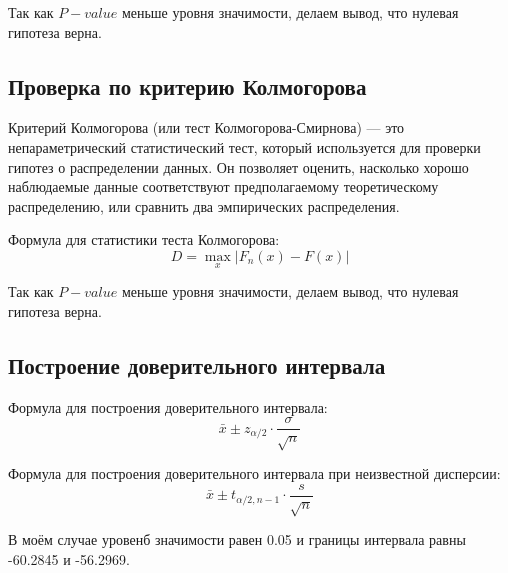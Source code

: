 Так как $P-value$ меньше уровня значимости, делаем вывод, что нулевая гипотеза верна.

\subsection*{Проверка по критерию Колмогорова}

Критерий Колмогорова (или тест Колмогорова-Смирнова) — это непараметрический статистический тест, который используется для проверки гипотез о распределении данных. Он позволяет оценить, насколько хорошо наблюдаемые данные соответствуют предполагаемому теоретическому распределению, или сравнить два эмпирических распределения.

Формула для статистики теста Колмогорова:
\[ D = \max_{x} |F_n(x) - F(x)| \]

\begin{spacing}{1.0}
    
\end{spacing}

Так как $P-value$ меньше уровня значимости, делаем вывод, что нулевая гипотеза верна.

\subsection*{Построение доверительного интервала}

Формула для построения доверительного интервала:
\[ \bar{x} \pm z_{\alpha/2} \cdot \frac{\sigma}{\sqrt{n}} \]

Формула для построения доверительного интервала при неизвестной дисперсии:
\[ \bar{x} \pm t_{\alpha/2, n-1} \cdot \frac{s}{\sqrt{n}} \]

В моём случае уровенб значимости равен 0.05 и границы интервала равны -60.2845 и -56.2969.
